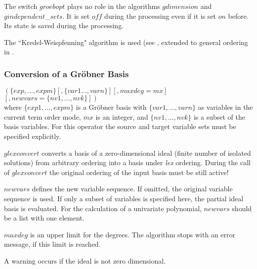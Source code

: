 The switch $groebopt$ plays no role in the algorithms $gdimension$ and
$gindependent$\_$sets$. It is set $off$ during the processing even if
it is set $on$ before. Its state is saved during the processing.

The ``Kredel-Weispfenning" algorithm is used (see \cite{Kredel:88a},
extended to general ordering in \cite{BeWei:93}.

\subsubsection{Conversion of a Gr\"obner Basis}

\begin{description}
\item[{\it glexconvert}] $ \left(\{exp,\ldots , expm\} \left[,\{var1
\ldots , varn\}\right]\left[,maxdeg=mx\right]\right.$ \\
$\left.\left[,newvars=\{nv1, \ldots , nvk\}\right]\right) $ \\
where $\{exp1, \ldots , expm\}$ is a Gr\"obner basis with
$\{var1, \ldots , varn\}$ as variables in the current term order mode,
$mx$ is an integer, and
$\{nv1, \ldots , nvk\}$ is a subset of the basis variables.
For this operator the source and target variable sets must be specified
explicitly.
\end{description}

$glexconvert$ converts a basis of a zero-dimensional ideal (finite number
of isolated solutions) from arbitrary ordering into a basis under {\it
lex} ordering. During the call of $glexconvert$ the original ordering of
the input basis must be still active!

$newvars$ defines the new variable sequence. If omitted, the
original variable sequence is used. If only a subset of variables is
specified here, the partial ideal basis is evaluated. For the
calculation of a univariate polynomial, $new$\-$vars$ should be a list
with one element.

$maxdeg$ is an upper limit for the degrees. The algorithm stops with
an error message, if this limit is reached.

A warning occurs if the ideal is not zero dimensional.

